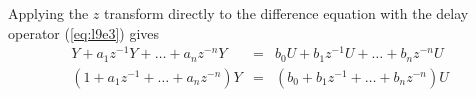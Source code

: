 Applying the $z$ transform directly to the difference equation
with the delay operator (\ref{eq:l9e3}) gives
\begin{eqnarray}\label{l9e5}
 Y + a_{1}z^{-1} Y + \ldots + a_n z^{-n} Y
&=& b_0 U + b_{1}z^{-1} U + \ldots + b_n z^{-n} U\\\nonumber (1 +
a_{1}z^{-1} + \ldots +  a_n z^{-n}) Y &=& (b_0 + b_{1}z^{-1} +
\ldots + b_n z^{-n}) U \label{eq:19e6}
   \end{eqnarray}
\endinput
